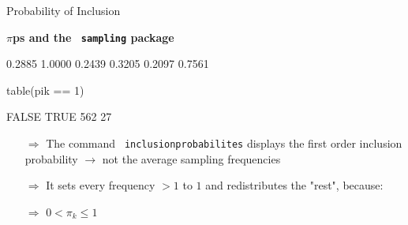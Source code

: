 \documentclass[11pt,german,hideothersubsections]{beamer}
\newcommand{\R}[1]{{\tt \color{blue}  #1}}
\begin{document}
\begin{frame}[fragile]{Probability of Inclusion}
\footnotesize{
\begin{center}
\textbf{$\pi$ps and the \R{sampling} package}
\end{center}
\begin{Schunk}
\begin{Soutput}
[1] 0.2885 1.0000 0.2439 0.3205 0.2097 0.7561
\end{Soutput}
\begin{Sinput}
 table(pik == 1)
\end{Sinput}
\begin{Soutput}
FALSE  TRUE 
  562    27 
\end{Soutput}
\end{Schunk}
\begin{itemize}
\pause\item[$\Rightarrow$] The command \R{inclusionprobabilites} displays the first order inclusion probability $\rightarrow$ not the average sampling frequencies
\item[$\Rightarrow$] It sets every frequency $>1$ to $1$ and redistributes the "rest", because:
\pause\item[$\Rightarrow$] $0<\pi_k$
\end{itemize}
}
\end{frame}
\end{document}
